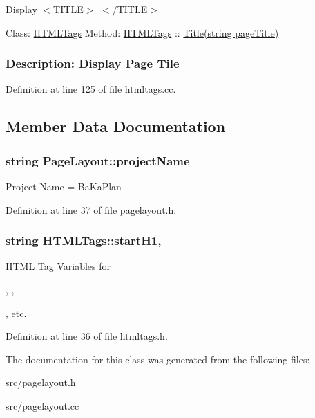 Display $<$\-T\-I\-T\-L\-E$>$ $<$/\-T\-I\-T\-L\-E$>$ 



 Class\-: \hyperlink{classHTMLTags}{H\-T\-M\-L\-Tags} Method\-: \hyperlink{classHTMLTags}{H\-T\-M\-L\-Tags} \-:\-: \hyperlink{classHTMLTags_a5128d6f1c6be5ac1689047fc9d0d159f}{Title(string page\-Title)} \subsubsection*{Description\-: Display Page Tile}

Definition at line 125 of file htmltags.\-cc.



\subsection{Member Data Documentation}
\hypertarget{classPageLayout_a8a3c1ddc422df2556fbc95d0cd575a05}{
\subsubsection[{project\-Name}]{\setlength{\rightskip}{0pt plus 5cm}string Page\-Layout\-::project\-Name\hspace{0.3cm}{\ttfamily [protected]}}}\label{classPageLayout_a8a3c1ddc422df2556fbc95d0cd575a05}
Project Name = Ba\-Ka\-Plan 

Definition at line 37 of file pagelayout.\-h.

\hypertarget{classHTMLTags_ae987289d0dab2e3e234048615f930d0f}{
\subsubsection[{start\-H1}]{\setlength{\rightskip}{0pt plus 5cm}string H\-T\-M\-L\-Tags\-::start\-H1\hspace{0.3cm}{\ttfamily [protected]}, {\ttfamily [inherited]}}}\label{classHTMLTags_ae987289d0dab2e3e234048615f930d0f}


H\-T\-M\-L Tag Variables for 

, , 

, etc. 



Definition at line 36 of file htmltags.\-h.



The documentation for this class was generated from the following files\-:\begin{DoxyCompactItemize}
\item 
src/pagelayout.\-h\item 
src/pagelayout.\-cc\end{DoxyCompactItemize}

